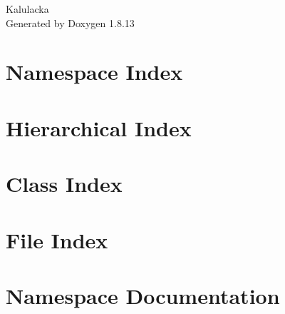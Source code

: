 \documentclass[twoside]{book}
\newcommand{\+}{\discretionary{\mbox{\scriptsize$\hookleftarrow$}}{}{}}
\newcommand{\clearemptydoublepage}{%
  \newpage{\pagestyle{empty}\cleardoublepage}%
}
\begin{document}
\hypersetup{pageanchor=false,
             bookmarksnumbered=true,
             pdfencoding=unicode
            }
\begin{titlepage}
\vspace*{7cm}
\begin{center}%
{\Large Kalulacka }\\
\vspace*{1cm}
{\large Generated by Doxygen 1.8.13}\\
\end{center}
\end{titlepage}
\clearemptydoublepage
{}
\tableofcontents
\clearemptydoublepage
{}
\hypersetup{pageanchor=true}

\chapter{Namespace Index}

\chapter{Hierarchical Index}

\chapter{Class Index}

\chapter{File Index}

\chapter{Namespace Documentation}



\end{document}

